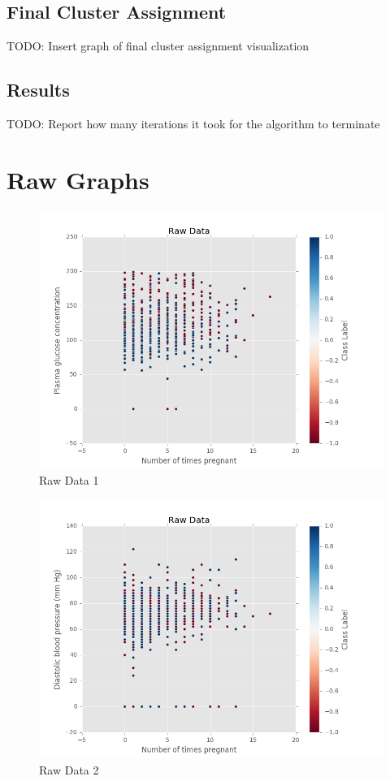 \documentclass[12pt]{article}
\begin{document}
\subsection*{Final Cluster Assignment}
TODO: Insert graph of final cluster assignment visualization
\subsection*{Results}
TODO: Report how many iterations it took for the algorithm to terminate

\newpage
\section*{Raw Graphs}
\begin{figure}[H]
\begin{center}
\includegraphics[scale=0.66]{graph1.png}
\caption{Raw Data 1}
\label{Raw Data 1}
\end{center}
\end{figure}

\begin{figure}[H]
\begin{center}
\includegraphics[scale=0.66]{graph2.png}
\caption{Raw Data 2}
\label{Raw Data 2}
\end{center}
\end{figure}
\end{document}
